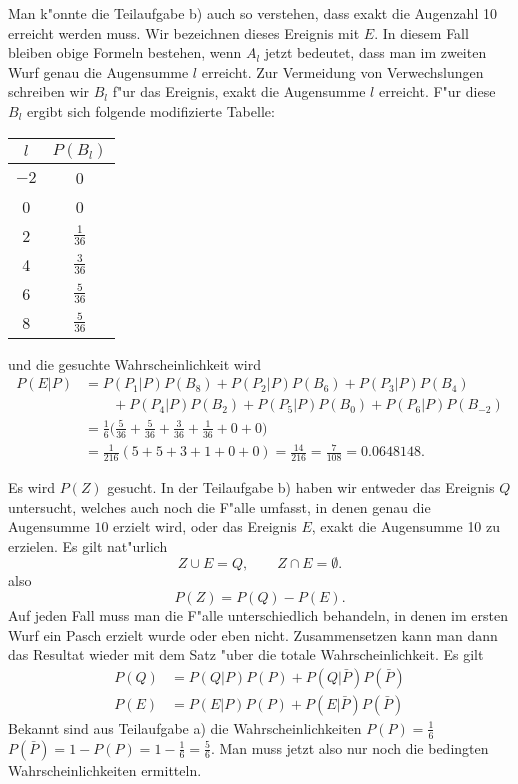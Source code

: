 \begin{loesung}
\begin{teilaufgaben}
Man k"onnte die Teilaufgabe b) auch so verstehen, dass exakt die
Augenzahl 10 erreicht werden muss. Wir bezeichnen dieses Ereignis
mit $E$. In diesem Fall bleiben obige
Formeln bestehen, wenn $A_l$ jetzt bedeutet, dass man im zweiten
Wurf genau die Augensumme $l$ erreicht. Zur Vermeidung von Verwechslungen
schreiben wir $B_l$ f"ur das Ereignis, exakt die Augensumme $l$ erreicht.
F"ur diese $B_l$ ergibt sich
folgende modifizierte Tabelle:
\begin{center}
\begin{tabular}{|c|c|}
\hline
$l$&$P(B_l)$\\
\hline
$-2$&0\\
0&0\\
2&$\frac{1}{36}$\\
4&$\frac{3}{36}$\\
6&$\frac{5}{36}$\\
8&$\frac{5}{36}$\\
\hline
\end{tabular}
\end{center}
und die gesuchte Wahrscheinlichkeit wird
\begin{align*}
P(E|P)
&=P(P_1|P) P(B_8) + P(P_2|P) P(B_6) + P(P_3|P) P(B_4) \\
&\qquad + P(P_4|P)P(B_2) + P(P_5|P) P(B_0) + P(P_6|P) P(B_{-2})\\
&=
\frac1{6}\biggl(\frac{5}{36} + \frac{5}{36} + \frac{3}{36} + \frac{1}{36} + 0 + 0\biggr)
\\
&=
\frac1{216}(5 + 5 + 3 + 1 + 0 + 0)
=
\frac{14}{216}=\frac{7}{108}=0.0648148.
\end{align*}

\item
Es wird $P(Z)$ gesucht.
In der Teilaufgabe b) haben wir entweder das Ereignis
$Q$ untersucht, welches auch noch die F"alle umfasst, in denen genau
die Augensumme $10$ erzielt wird, oder das Ereignis $E$, exakt die Augensumme
10 zu erzielen. Es gilt nat"urlich
\[
Z\cup E = Q,\qquad Z\cap E=\emptyset.
\]
also
\[
P(Z)=P(Q)-P(E).
\]
Auf jeden Fall muss man die F"alle unterschiedlich behandeln, in denen
im ersten Wurf ein Pasch erzielt wurde oder eben nicht. Zusammensetzen
kann man dann das Resultat wieder mit dem Satz "uber die totale
Wahrscheinlichkeit. Es gilt
\begin{align*}
P(Q)&=P(Q|P)P(P) + P(Q|\bar P)P(\bar P)\\
P(E)&=P(E|P)P(P) + P(E|\bar P)P(\bar P)
\end{align*}
Bekannt sind aus Teilaufgabe a) die Wahrscheinlichkeiten
$P(P)=\frac16$
$P(\bar P)=1-P(P)=1-\frac16=\frac56$. Man muss jetzt also nur noch die
bedingten Wahrscheinlichkeiten ermitteln.


\end{teilaufgaben}
\end{loesung}

